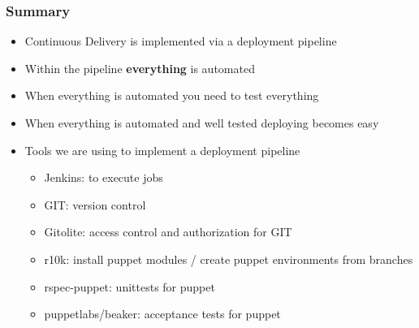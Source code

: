 \documentclass{beamer}
\begin{document}
\begin{frame}
  \frametitle{Summary}

  \begin{itemize}
  \item<1-> Continuous Delivery is implemented via a deployment pipeline
  \item<2-> Within the pipeline \textbf{everything} is automated
  \item<3-> When everything is automated you need to test everything
  \item<4-> When everything is automated and well tested deploying becomes easy
  \item<5-> Tools we are using to implement a deployment pipeline
    \begin{itemize}
    \item Jenkins: to execute jobs
    \item GIT: version control
    \item Gitolite: access control and authorization for GIT
    \item r10k: install puppet modules / create puppet environments from branches
    \item rspec-puppet: unittests for puppet
    \item puppetlabs/beaker: acceptance tests for puppet
    \end{itemize}
  \end{itemize}
\end{frame}

\begin{frame}
\end{frame}
\end{document}

